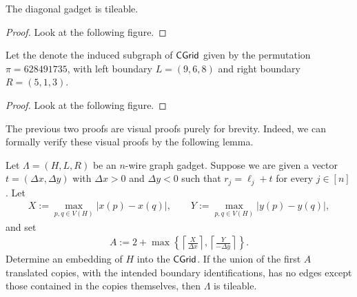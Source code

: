 \begin{fact}
The diagonal gadget is tileable.
\end{fact}

\begin{proof}
Look at the following figure.
\end{proof}



\begin{definition}
Let the  denote the induced subgraph of $\mathsf{CGrid}$ given by the permutation $\pi=628491735$, with left boundary $L=(9,6,8)$ and right boundary $R=(5,1,3)$.
\end{definition}



\begin{proof}
Look at the following figure.
\end{proof}



The previous two proofs are visual proofs purely for brevity. Indeed, we can formally verify these visual proofs by the following lemma.

\begin{lemma}
\label{lem:tileable-witness}
Let $\Lambda=(H,L,R)$ be an $n$-wire graph gadget.
Suppose we are given a vector $t=(\Delta x,\Delta y)$ with
$\Delta x>0$ and $\Delta y<0$ such that
$r_j=\ell_j+t$ for every $j\in[n]$.
Let
\begin{align}
    X := \max_{p,q\in V(H)} |x(p)-x(q)|,
    \qquad
    Y := \max_{p,q\in V(H)} |y(p)-y(q)|,
\end{align}
and set
\begin{align}
    A
    :=
    2+
    \max\left\{
        \left\lceil \frac{X}{\Delta x} \right\rceil,
        \left\lceil \frac{Y}{-\Delta y} \right\rceil
    \right\}.
\end{align}
Determine an embedding of $H$ into the $\mathsf{CGrid}$. If the union of the first \(A\) translated copies, with the intended boundary
identifications, has no edges except those contained in the copies themselves,
then \(\Lambda\) is tileable.
\end{lemma}

